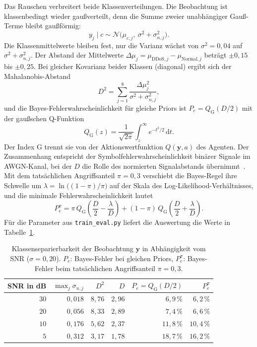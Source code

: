 Das Rauschen verbreitert beide Klassenverteilungen. Die Beobachtung ist klassenbedingt wieder gaußverteilt, denn die Summe zweier unabhängiger Gauß-Terme bleibt gaußförmig:
\begin{equation}
	y_j\mid c\sim\mathcal{N}\!\bigl(\mu_{c,j},\ \sigma^2+\sigma_{n,j}^2\bigr).
\end{equation}
Die Klassenmittelwerte bleiben fest, nur die Varianz wächst von $\sigma^2=0{,}04$ auf $\sigma^2+\sigma_{n,j}^2$. Der Abstand der Mittelwerte $\Delta\mu_j=\mu_{\text{DDoS},j}-\mu_{\text{Normal},j}$ beträgt $\pm0{,}15$ bis $\pm0{,}25$. Bei gleicher Kovarianz beider Klassen (diagonal) ergibt sich der Mahalanobis-Abstand
\begin{equation}
	D^{2}=\sum_{j=1}^{8}\frac{\Delta\mu_j^{2}}{\sigma^{2}+\sigma_{n,j}^{2}},
\end{equation}
und die Bayes-Fehlerwahrscheinlichkeit für gleiche Priors ist $P_e=Q_{\mathrm{G}}(D/2)$ mit der gaußschen Q-Funktion
\begin{equation}
	Q_{\mathrm{G}}(z)=\frac{1}{\sqrt{2\pi}}\int_{z}^{\infty}e^{-t^{2}/2}\,\mathrm{d}t .
\end{equation}
Der Index G trennt sie von der Aktionswertfunktion $Q(\mathbf{y},a)$ des Agenten. Der Zusammenhang entspricht der Symbolfehlerwahrscheinlichkeit binärer Signale im AWGN-Kanal, bei der $D$ die Rolle des normierten Signalabstands übernimmt~\autocite{proakisDigitalCommunications2008}. Mit dem tatsächlichen Angriffsanteil $\pi=0{,}3$ verschiebt die Bayes-Regel ihre Schwelle um $\lambda=\ln\bigl((1-\pi)/\pi\bigr)$ auf der Skala des Log-Likelihood-Verhältnisses, und die minimale Fehlerwahrscheinlichkeit lautet
\begin{equation}
	P_e^{\pi}=\pi\,Q_{\mathrm{G}}\!\left(\frac{D}{2}-\frac{\lambda}{D}\right)+(1-\pi)\,Q_{\mathrm{G}}\!\left(\frac{D}{2}+\frac{\lambda}{D}\right).
\end{equation}
Für die Parameter aus \texttt{train\_eval.py} liefert die Auswertung die Werte in Tabelle~\ref{tab:klassenueberlappung}.

\begin{table}[htbp]
	\centering
	\renewcommand{\arraystretch}{1.25}
	\caption[Klassenseparierbarkeit der Beobachtung in Abhängigkeit vom SNR]{Klassenseparierbarkeit der Beobachtung $\mathbf{y}$ in Abhängigkeit vom SNR ($\sigma=0{,}20$). $P_e$: Bayes-Fehler bei gleichen Priors, $P_e^{\pi}$: Bayes-Fehler beim tatsächlichen Angriffsanteil $\pi=0{,}3$.}
	\label{tab:klassenueberlappung}
	\begin{tabular}{rrrrrr}
		\toprule
		\textbf{SNR in dB} & $\max_j\sigma_{n,j}$ & $D^{2}$ & $D$ & $P_e=Q_{\mathrm{G}}(D/2)$ & $P_e^{\pi}$ \\
		\midrule
		$30$ & $0{,}018$ & $8{,}76$ & $2{,}96$ & $6{,}9\,\%$ & $6{,}2\,\%$ \\
		$20$ & $0{,}056$ & $8{,}33$ & $2{,}89$ & $7{,}4\,\%$ & $6{,}6\,\%$ \\
		$10$ & $0{,}176$ & $5{,}62$ & $2{,}37$ & $11{,}8\,\%$ & $10{,}4\,\%$ \\
		$5$  & $0{,}312$ & $3{,}17$ & $1{,}78$ & $18{,}7\,\%$ & $16{,}2\,\%$ \\
		\bottomrule
	\end{tabular}
\end{table}

